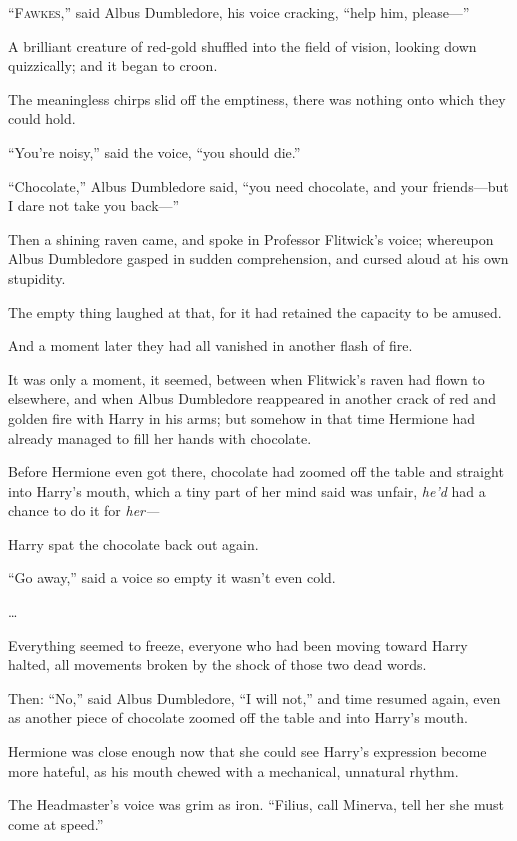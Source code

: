 
\lettrine{“F}{awkes},” said
Albus Dumbledore, his voice cracking, “help him, please—”

A brilliant creature of red-gold shuffled into the field of vision, looking down quizzically; and it began to croon.

The meaningless chirps slid off the emptiness, there was nothing onto which they could hold.

“You’re noisy,” said the voice, “you should die.”

“Chocolate,” Albus Dumbledore said, “you need chocolate, and your friends—but I dare not take you back—”

Then a shining raven came, and spoke in Professor Flitwick’s voice; whereupon Albus Dumbledore gasped in sudden comprehension, and cursed aloud at his own stupidity.

The empty thing laughed at that, for it had retained the capacity to be amused.

And a moment later they had all vanished in another flash of fire.

\later

It was only a moment, it seemed, between when Flitwick’s raven had flown to elsewhere, and when Albus Dumbledore reappeared in another crack of red and golden fire with Harry in his arms; but somehow in that time Hermione had already managed to fill her hands with chocolate.

Before Hermione even got there, chocolate had zoomed off the table and straight into Harry’s mouth, which a tiny part of her mind said was unfair, \emph{he’d} had a chance to do it for \emph{her—}

Harry spat the chocolate back out again.

“Go away,” said a voice so empty it wasn’t even cold.

…

Everything seemed to freeze, everyone who had been moving toward Harry halted, all movements broken by the shock of those two dead words.

Then: “No,” said Albus Dumbledore, “I will not,” and time resumed again, even as another piece of chocolate zoomed off the table and into Harry’s mouth.

Hermione was close enough now that she could see Harry’s expression become more hateful, as his mouth chewed with a mechanical, unnatural rhythm.

The Headmaster’s voice was grim as iron. “Filius, call Minerva, tell her she must come at speed.”

